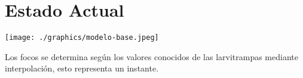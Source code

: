 \section{Estado Actual}
\label{sec:solucion-instantanea}
\texttt{[image: ./graphics/modelo-base.jpeg]}

Los focos se determina según los valores conocidos de las larvitrampas mediante interpolación, esto representa un instante.
